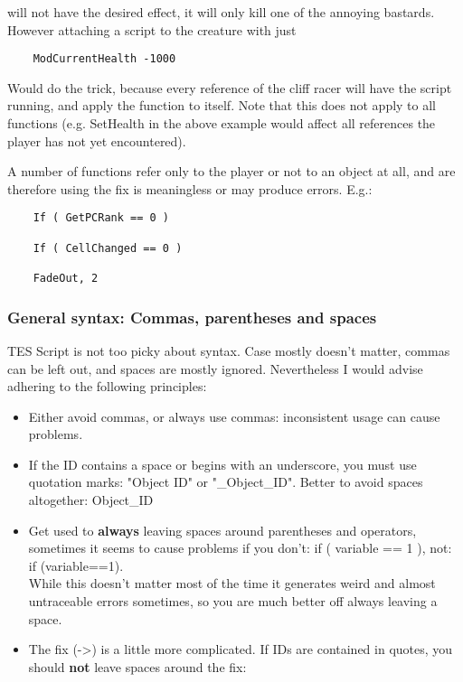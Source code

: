 will not have the desired effect, it will only kill one of the annoying
bastards. However attaching a script to the creature with just

\begin{lstlisting}
	ModCurrentHealth -1000
\end{lstlisting}

Would do the trick, because every reference of the cliff racer will have
the script running, and apply the function to itself. Note that this
does not apply to all functions (e.g. SetHealth in the above example
would affect all references the player has not yet encountered).

A number of functions refer only to the player or not to an object at
all, and are therefore using the fix is meaningless or may produce
errors. E.g.:

\begin{lstlisting}
	If ( GetPCRank == 0 )
	
	If ( CellChanged == 0 )
	
	FadeOut, 2
\end{lstlisting}

\hypertarget{general-syntax-commas-parentheses-and-spaces}{%
\subsubsection{General syntax: Commas, parentheses and
spaces}\label{general-syntax-commas-parentheses-and-spaces}}

TES Script is not too picky about syntax. Case mostly doesn't matter,
commas can be left out, and spaces are mostly ignored. Nevertheless I
would advise adhering to the following principles:

\begin{itemize}
\item
  Either avoid commas, or always use commas: inconsistent usage can
  cause problems.
\item
  If the ID contains a space or begins with an underscore, you must use
  quotation marks: "Object ID" or "\_Object\_ID". Better to avoid spaces
  altogether: Object\_ID
\item
  Get used to \textbf{always} leaving spaces around parentheses and
  operators, sometimes it seems to cause problems if you don't: if (
  variable == 1 ), not: if (variable==1).\\
  While this doesn't matter most of the time it generates weird and
  almost untraceable errors sometimes, so you are much better off always
  leaving a space.
\item
  The fix (-\textgreater) is a little more complicated. If IDs are
  contained in quotes, you should \textbf{not} leave spaces around the
  fix:
\end{itemize}

